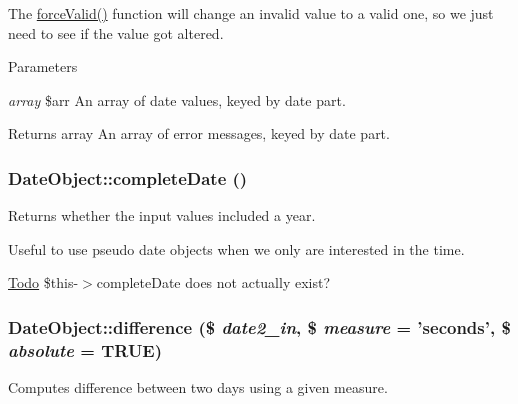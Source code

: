 The \hyperlink{classDateObject_a6dfed6663a0da8662e3cbfa1886d8396}{forceValid()} function will change an invalid value to a valid one, so we just need to see if the value got altered.


\begin{DoxyParams}{Parameters}
\item[{\em array}]\$arr An array of date values, keyed by date part.\end{DoxyParams}
\begin{DoxyReturn}{Returns}
array An array of error messages, keyed by date part. 
\end{DoxyReturn}
\hypertarget{classDateObject_af83b95282617a2d2ec4dded415f84ed7}{
\subsubsection[{completeDate}]{\setlength{\rightskip}{0pt plus 5cm}DateObject::completeDate ()}}
\label{classDateObject_af83b95282617a2d2ec4dded415f84ed7}
Returns whether the input values included a year.

Useful to use pseudo date objects when we only are interested in the time.

\begin{Desc}
\item[\hyperlink{todo__todo000048}{Todo}]\$this-\/$>$completeDate does not actually exist? \end{Desc}
\hypertarget{classDateObject_a58a7653254c911f52b506e028b5bc35a}{
\subsubsection[{difference}]{\setlength{\rightskip}{0pt plus 5cm}DateObject::difference (\$ {\em date2\_\-in}, \/  \$ {\em measure} = {\ttfamily 'seconds'}, \/  \$ {\em absolute} = {\ttfamily TRUE})}}
\label{classDateObject_a58a7653254c911f52b506e028b5bc35a}
Computes difference between two days using a given measure.


